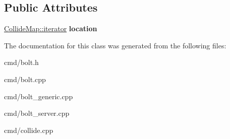 \subsection*{Public Attributes}
\begin{DoxyCompactItemize}
\item 
\hyperlink{classCollidable}{Collide\+Map\+::iterator} {\bfseries location}\hypertarget{classBolt_af494d7935d5d49a2158e86495beba801}{}\label{classBolt_af494d7935d5d49a2158e86495beba801}

\end{DoxyCompactItemize}


The documentation for this class was generated from the following files\+:\begin{DoxyCompactItemize}
\item 
cmd/bolt.\+h\item 
cmd/bolt.\+cpp\item 
cmd/bolt\+\_\+generic.\+cpp\item 
cmd/bolt\+\_\+server.\+cpp\item 
cmd/collide.\+cpp\end{DoxyCompactItemize}
